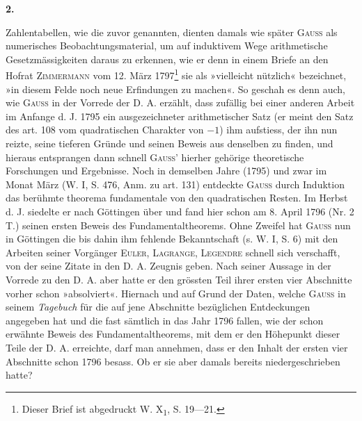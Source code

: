 \par\bigskip{}
\begin{center}\bfseries 2.\end{center}
\noindent\hspace*{\parindent}Zahlentabellen, wie die zuvor genannten, dienten damals wie später \textsc{Gauss} als numerisches Beobachtungsmaterial, um auf induktivem Wege arithmetische Gesetzmässigkeiten daraus zu erkennen, wie er denn in einem Briefe an den Hofrat \textsc{Zimmermann} vom 12. März 1797\footnote{Dieser Brief ist abgedruckt W. X\textsubscript{1}, S. 19—21.} sie als »vielleicht nützlich« bezeichnet, »in diesem Felde noch neue Erfindungen zu machen«. So geschah es denn auch, wie \textsc{Gauss} in der Vorrede der D. A. erzählt, dass zufällig bei einer anderen Arbeit im Anfange d. J. 1795 ein ausgezeichneter arithmetischer Satz (er meint den Satz des art. 108 vom quadratischen Charakter von \(-1\)) ihm aufstiess, der ihn nun reizte, seine tieferen Gründe und seinen Beweis aus denselben zu finden, und hieraus entsprangen dann schnell \textsc{Gauss}’ hierher gehörige theoretische Forschungen und Ergebnisse. Noch in demselben Jahre (1795) und zwar im Monat März (W. I, S. 476, Anm. zu art. 131) entdeckte \textsc{Gauss} durch Induktion das berühmte theorema fundamentale von den quadratischen Resten. Im Herbst d. J. siedelte er nach Göttingen über und fand hier schon am 8. April 1796 (Nr. 2 T.) seinen ersten Beweis des Fundamentaltheorems. Ohne Zweifel hat \textsc{Gauss} nun in Göttingen die bis dahin ihm fehlende Bekanntschaft (s. W. I, S. 6) mit den Arbeiten seiner Vorgänger \textsc{Euler}, \textsc{Lagrange}, \textsc{Legendre} schnell sich verschafft, von der seine Zitate in den D. A. Zeugnis geben. Nach seiner Aussage in der Vorrede zu den D. A. aber hatte er den grössten Teil ihrer ersten vier Abschnitte vorher schon »absolviert«. Hiernach und auf Grund der Daten, welche \textsc{Gauss} in seinem \textit{Tagebuch} für die auf jene Abschnitte bezüglichen Entdeckungen angegeben hat und die fast sämtlich in\newpage
{}
\noindent das Jahr 1796 fallen, wie der schon erwähnte Beweis des Fundamentaltheorems, mit dem er den Höhepunkt dieser Teile der D. A. erreichte, darf man annehmen, dass er den Inhalt der ersten vier Abschnitte schon 1796 besass. Ob er sie aber damals bereits niedergeschrieben hatte?

